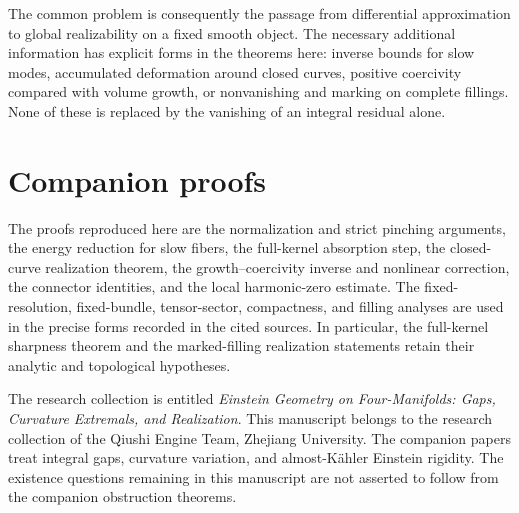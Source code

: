 \documentclass[11pt,a4paper]{article}
\theoremstyle{definition}\newtheorem{definition}[theorem]{Definition}
\theoremstyle{remark}\newtheorem{remark}[theorem]{Remark}
\begin{document}
The common problem is consequently the passage from differential approximation to global realizability on a fixed smooth object. The necessary additional information has explicit forms in the theorems here: inverse bounds for slow modes, accumulated deformation around closed curves, positive coercivity compared with volume growth, or nonvanishing and marking on complete fillings. None of these is replaced by the vanishing of an integral residual alone.

\section*{Companion proofs}
The proofs reproduced here are the normalization and strict pinching arguments, the energy reduction for slow fibers, the full-kernel absorption step, the closed-curve realization theorem, the growth--coercivity inverse and nonlinear correction, the connector identities, and the local harmonic-zero estimate. The fixed-resolution, fixed-bundle, tensor-sector, compactness, and filling analyses are used in the precise forms recorded in the cited sources. In particular, the full-kernel sharpness theorem and the marked-filling realization statements retain their analytic and topological hypotheses.

The research collection is entitled \emph{Einstein Geometry on Four-Manifolds: Gaps, Curvature Extremals, and Realization}. This manuscript belongs to the research collection of the Qiushi Engine Team, Zhejiang University. The companion papers treat integral gaps, curvature variation, and almost-K\"ahler Einstein rigidity. The existence questions remaining in this manuscript are not asserted to follow from the companion obstruction theorems.
\end{document}
